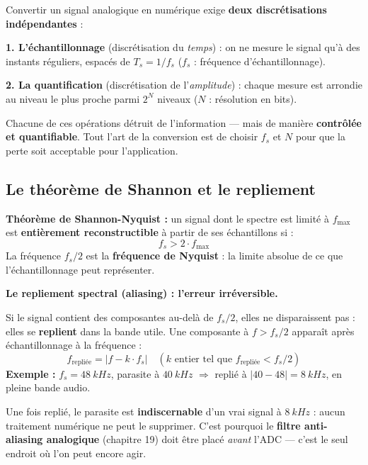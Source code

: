 \documentclass[12pt,a4paper,twoside]{book}
\begin{document}
\begin{formule}
Convertir un signal analogique en numérique exige \textbf{deux discrétisations indépendantes} :

\textbf{1. L'échantillonnage} (discrétisation du \textit{temps}) : on ne mesure le signal qu'à des instants réguliers, espacés de $T_s = 1/f_s$ ($f_s$ : fréquence d'échantillonnage).

\textbf{2. La quantification} (discrétisation de l'\textit{amplitude}) : chaque mesure est arrondie au niveau le plus proche parmi $2^N$ niveaux ($N$ : résolution en bits).

Chacune de ces opérations détruit de l'information --- mais de manière \textbf{contrôlée et quantifiable}. Tout l'art de la conversion est de choisir $f_s$ et $N$ pour que la perte soit acceptable pour l'application.
\end{formule}

\subsection{Le théorème de Shannon et le repliement}

\begin{formule}
\textbf{Théorème de Shannon-Nyquist :} un signal dont le spectre est limité à $f_{\max}$ est \textbf{entièrement reconstructible} à partir de ses échantillons si :
\[
\boxed{f_s > 2 \cdot f_{\max}}
\]
La fréquence $f_s/2$ est la \textbf{fréquence de Nyquist} : la limite absolue de ce que l'échantillonnage peut représenter.
\end{formule}

\begin{attention}
\textbf{Le repliement spectral (aliasing) : l'erreur irréversible.}

Si le signal contient des composantes au-delà de $f_s/2$, elles ne disparaissent pas : elles se \textbf{replient} dans la bande utile. Une composante à $f > f_s/2$ apparaît après échantillonnage à la fréquence :
\[
f_{\text{repliée}} = |f - k \cdot f_s| \quad (k \text{ entier tel que } f_{\text{repliée}} < f_s/2)
\]
\textbf{Exemple :} $f_s = \SI{48}{kHz}$, parasite à $\SI{40}{kHz}$ $\Rightarrow$ replié à $|40-48| = \SI{8}{kHz}$, en pleine bande audio.

Une fois replié, le parasite est \textbf{indiscernable} d'un vrai signal à $\SI{8}{kHz}$ : aucun traitement numérique ne peut le supprimer. C'est pourquoi le \textbf{filtre anti-aliasing analogique} (chapitre 19) doit être placé \textit{avant} l'ADC --- c'est le seul endroit où l'on peut encore agir.
\end{attention}
\end{document}
